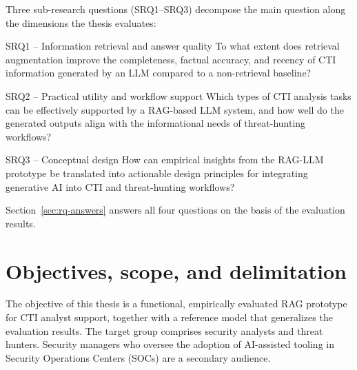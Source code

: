 Three sub-research questions (SRQ1--SRQ3) decompose the main question
along the dimensions the thesis evaluates:

\begin{rqbox}{SRQ1 -- Information retrieval and answer quality}
    To what extent does retrieval augmentation improve the completeness,
    factual accuracy, and recency of CTI information generated by an LLM
    compared to a non-retrieval baseline?
\end{rqbox}

\begin{rqbox}{SRQ2 -- Practical utility and workflow support}
    Which types of CTI analysis tasks can be effectively supported by a
    RAG-based LLM system, and how well do the generated outputs align with
    the informational needs of threat-hunting workflows?
\end{rqbox}

\begin{rqbox}{SRQ3 -- Conceptual design}
    How can empirical insights from the RAG-LLM prototype be translated
    into actionable design principles for integrating generative AI into
    CTI and threat-hunting workflows?
\end{rqbox}

Section~\ref{sec:rq-answers} answers all four questions on the basis of
the evaluation results.

\section{Objectives, scope, and delimitation}
\label{sec:scope}

The objective of this thesis is a functional, empirically evaluated RAG
prototype for CTI analyst support, together with a reference model that
generalizes the evaluation results. The target group comprises security
analysts and threat hunters. Security managers who oversee the adoption of
AI-assisted tooling in Security Operations Centers (SOCs) are a secondary
audience.

